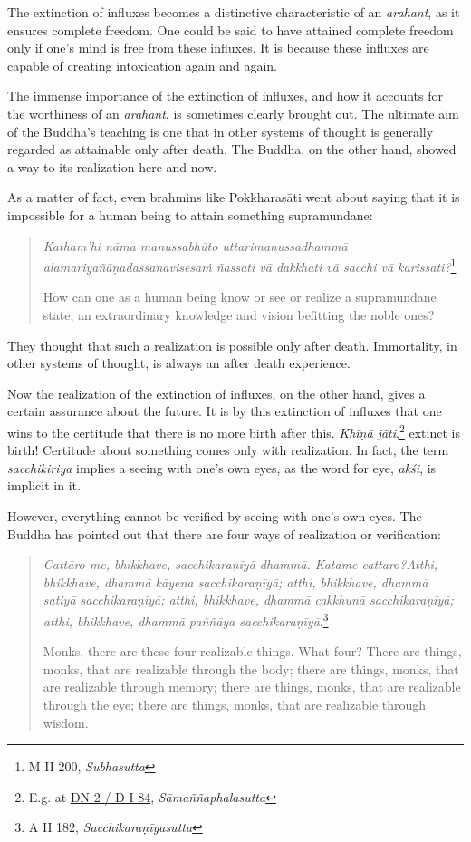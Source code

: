 The extinction of influxes becomes a distinctive characteristic of an \emph{arahant}, as it ensures complete freedom. One could be said to have attained complete freedom only if one's mind is free from these influxes. It is because these influxes are capable of creating intoxication again and again.

The immense importance of the extinction of influxes, and how it accounts for the worthiness of an \emph{arahant}, is sometimes clearly brought out. The ultimate aim of the Buddha's teaching is one that in other systems of thought is generally regarded as attainable only after death. The Buddha, on the other hand, showed a way to its realization here and now.

As a matter of fact, even brahmins like Pokkharasāti went about saying that it is impossible for a human being to attain something supramundane:

\begin{quote}
\emph{Katham'hi nāma manussabhūto uttarimanussadhammā alamariyañāṇadassanavisesaṁ ñassati vā dakkhati vā sacchi vā karissati?}\footnote{M II 200, \emph{Subhasutta}}

How can one as a human being know or see or realize a supramundane state, an extraordinary knowledge and vision befitting the noble ones?
\end{quote}

They thought that such a realization is possible only after death. Immortality, in other systems of thought, is always an after death experience.

Now the realization of the extinction of influxes, on the other hand, gives a certain assurance about the future. It is by this extinction of influxes that one wins to the certitude that there is no more birth after this. \emph{Khīṇā jāti},\footnote{E.g. at \href{https://suttacentral.net/dn2/pli/ms}{DN 2 / D I 84}, \emph{Sāmaññaphalasutta}} extinct is birth! Certitude about something comes only with realization. In fact, the term \emph{sacchikiriya} implies a seeing with one's own eyes, as the word for eye, \emph{akśi}, is implicit in it.

However, everything cannot be verified by seeing with one's own eyes. The Buddha has pointed out that there are four ways of realization or verification:

\begin{quote}
\emph{Cattāro me, bhikkhave, sacchikaraṇīyā dhammā. Katame cattaro?Atthi, bhikkhave, dhammā kāyena sacchikaraṇīyā; atthi, bhikkhave, dhammā satiyā sacchikaraṇīyā; atthi, bhikkhave, dhammā cakkhunā sacchikaraṇīyā; atthi, bhikkhave, dhammā paññāya sacchikaraṇīyā}.\footnote{A II 182, \emph{Sacchikaraṇīyasutta}}

Monks, there are these four realizable things. What four? There are things, monks, that are realizable through the body; there are things, monks, that are realizable through memory; there are things, monks, that are realizable through the eye; there are things, monks, that are realizable through wisdom.
\end{quote}


